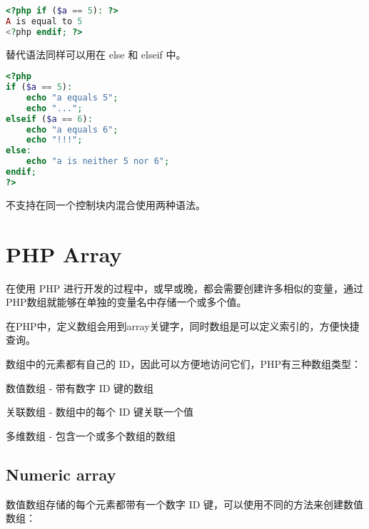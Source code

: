 \begin{lstlisting}[language=PHP]
<?php if ($a == 5): ?>
A is equal to 5
<?php endif; ?>
\end{lstlisting}

替代语法同样可以用在 else 和 elseif 中。

\begin{lstlisting}[language=PHP]
<?php
if ($a == 5):
    echo "a equals 5";
    echo "...";
elseif ($a == 6):
    echo "a equals 6";
    echo "!!!";
else:
    echo "a is neither 5 nor 6";
endif;
?>
\end{lstlisting}

不支持在同一个控制块内混合使用两种语法。

\chapter{PHP Array}



在使用 PHP 进行开发的过程中，或早或晚，都会需要创建许多相似的变量，通过PHP数组就能够在单独的变量名中存储一个或多个值。

在PHP中，定义数组会用到array关键字，同时数组是可以定义索引的，方便快捷查询。

数组中的元素都有自己的 ID，因此可以方便地访问它们，PHP有三种数组类型：

\begin{compactitem}
\item 数值数组 - 带有数字 ID 键的数组

\item 关联数组 - 数组中的每个 ID 键关联一个值

\item 多维数组 - 包含一个或多个数组的数组
\end{compactitem}






\section{Numeric array}

数值数组存储的每个元素都带有一个数字 ID 键，可以使用不同的方法来创建数值数组：

